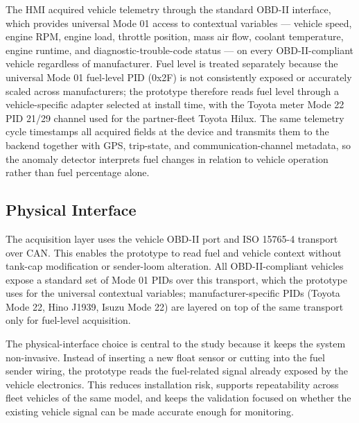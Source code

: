The HMI acquired vehicle telemetry through the standard OBD-II interface, which provides universal Mode 01 access to contextual variables --- vehicle speed, engine RPM, engine load, throttle position, mass air flow, coolant temperature, engine runtime, and diagnostic-trouble-code status --- on every OBD-II-compliant vehicle regardless of manufacturer. Fuel level is treated separately because the universal Mode 01 fuel-level PID (0x2F) is not consistently exposed or accurately scaled across manufacturers; the prototype therefore reads fuel level through a vehicle-specific adapter selected at install time, with the Toyota meter Mode 22 PID 21/29 channel used for the partner-fleet Toyota Hilux. The same telemetry cycle timestamps all acquired fields at the device and transmits them to the backend together with GPS, trip-state, and communication-channel metadata, so the anomaly detector interprets fuel changes in relation to vehicle operation rather than fuel percentage alone.

\subsection{Physical Interface}
The acquisition layer uses the vehicle OBD-II port and ISO 15765-4 transport over CAN. This enables the prototype to read fuel and vehicle context without tank-cap modification or sender-loom alteration. All OBD-II-compliant vehicles expose a standard set of Mode 01 PIDs over this transport, which the prototype uses for the universal contextual variables; manufacturer-specific PIDs (Toyota Mode 22, Hino J1939, Isuzu Mode 22) are layered on top of the same transport only for fuel-level acquisition.

The physical-interface choice is central to the study because it keeps the system non-invasive. Instead of inserting a new float sensor or cutting into the fuel sender wiring, the prototype reads the fuel-related signal already exposed by the vehicle electronics. This reduces installation risk, supports repeatability across fleet vehicles of the same model, and keeps the validation focused on whether the existing vehicle signal can be made accurate enough for monitoring.

